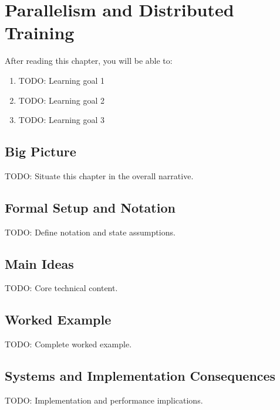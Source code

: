 \chapter{Parallelism and Distributed Training}
\label{ch:17}

\begin{keyinsight}
After reading this chapter, you will be able to:
\begin{enumerate}
  \item TODO: Learning goal 1
  \item TODO: Learning goal 2
  \item TODO: Learning goal 3
\end{enumerate}
\end{keyinsight}

\section{Big Picture}
\label{ch:17:sec:big_picture}

TODO: Situate this chapter in the overall narrative.

\section{Formal Setup and Notation}
\label{ch:17:sec:setup}

TODO: Define notation and state assumptions.

\section{Main Ideas}
\label{ch:17:sec:main}

TODO: Core technical content.

\section{Worked Example}
\label{ch:17:sec:example}

TODO: Complete worked example.

\section{Systems and Implementation Consequences}
\label{ch:17:sec:systems}

TODO: Implementation and performance implications.

